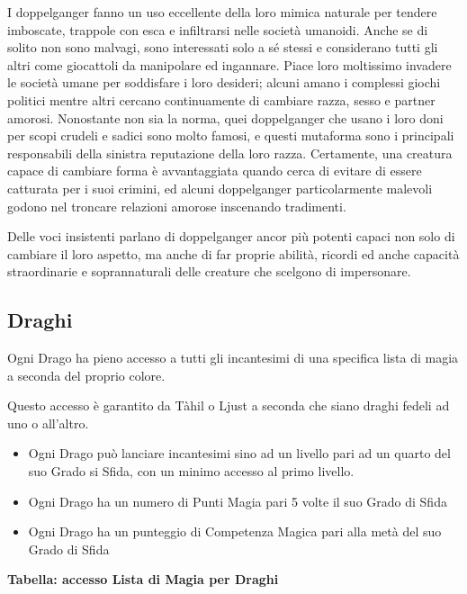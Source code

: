 \begin{multicols}{2}
I doppelganger fanno un uso eccellente della loro mimica naturale per tendere imboscate, trappole con esca e infiltrarsi nelle società umanoidi. Anche se di solito non sono malvagi, sono interessati solo a sé stessi e considerano tutti gli altri come giocattoli da manipolare ed ingannare. Piace loro moltissimo invadere le società umane per soddisfare i loro desideri; alcuni amano i complessi giochi politici mentre altri cercano continuamente di cambiare razza, sesso e partner amorosi. Nonostante non sia la norma, quei doppelganger che usano i loro doni per scopi crudeli e sadici sono molto famosi, e questi mutaforma sono i principali responsabili della sinistra reputazione della loro razza. Certamente, una creatura capace di cambiare forma è avvantaggiata quando cerca di evitare di essere catturata per i suoi crimini, ed alcuni doppelganger particolarmente malevoli godono nel troncare relazioni amorose inscenando tradimenti.

Delle voci insistenti parlano di doppelganger ancor più potenti capaci non solo di cambiare il loro aspetto, ma anche di far proprie abilità, ricordi ed anche capacità straordinarie e soprannaturali delle creature che scelgono di impersonare.


\subsection{Draghi}

Ogni Drago ha pieno accesso a tutti gli incantesimi di una specifica lista di magia a seconda del proprio colore.

Questo accesso è garantito da Tàhil o Ljust a seconda che siano draghi fedeli ad uno o all'altro.

\begin{itemize}
\item Ogni Drago può lanciare incantesimi sino ad un livello pari ad un quarto del suo Grado si Sfida, con un minimo accesso al primo livello.
\item Ogni Drago ha un numero di Punti Magia pari 5 volte il suo Grado di Sfida
\item Ogni Drago ha un punteggio di Competenza Magica pari alla metà del suo Grado di Sfida
\end{itemize}

\medskip

\textbf{Tabella: accesso Lista di Magia per Draghi}

\medskip


\end{multicols}
